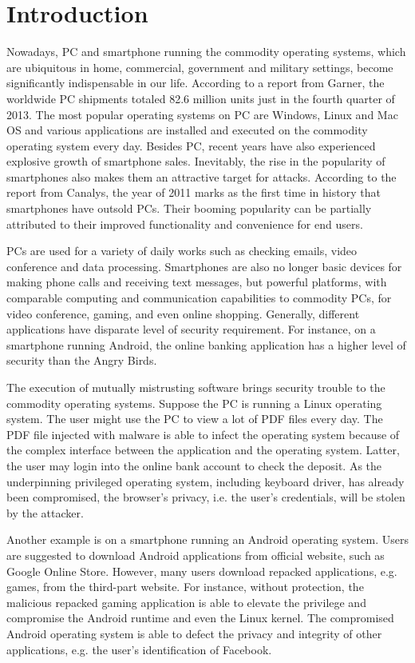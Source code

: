 \section{Introduction}
\label{sec:introduction}

Nowadays, PC and smartphone running the commodity operating systems, which are
ubiquitous in home, commercial, government and military settings, become
significantly indispensable in our life. According to a report from Garner, the
worldwide PC shipments totaled 82.6 million units just in the fourth quarter of
2013.  The most popular operating systems on PC are Windows, Linux and Mac OS
and various applications are installed and executed on the commodity operating
system every day. Besides PC, recent years have also experienced explosive
growth of smartphone sales. Inevitably, the rise in the popularity of
smartphones also makes them an attractive target for attacks. According to the
report from Canalys, the year of 2011 marks as the first time in history that
smartphones have outsold PCs. Their booming popularity can be partially
attributed to their improved functionality and convenience for end users. 

PCs are used for a variety of daily works such as checking emails, video
conference and data processing. Smartphones are also no longer basic devices for
making phone calls and receiving text messages, but powerful platforms, with
comparable computing and communication capabilities to commodity PCs, for video
conference, gaming, and even online shopping. Generally, different applications
have disparate level of security requirement. For instance, on a smartphone
running Android, the online banking application has a higher level of security
than the Angry Birds.

The execution of mutually mistrusting software brings security trouble to the
commodity operating systems. Suppose the PC is running a Linux operating system.
The user might use the PC to view a lot of PDF files every day. The PDF file
injected with malware is able to infect the operating system because of the
complex interface between the application and the operating system. Latter, the
user may login into the online bank account to check the deposit. As the
underpinning privileged operating system, including keyboard driver, has already
been compromised, the browser’s privacy, i.e. the user’s credentials, will be
stolen by the attacker.

Another example is on a smartphone running an Android operating system. Users
are suggested to download Android applications from official website, such as
Google Online Store. However, many users download repacked applications, e.g.
games, from the third-part website. For instance, without protection, the
malicious repacked gaming application is able to elevate the privilege and
compromise the Android runtime and even the Linux kernel. The compromised
Android operating system is able to defect the privacy and integrity of other
applications, e.g. the user’s identification of Facebook.

